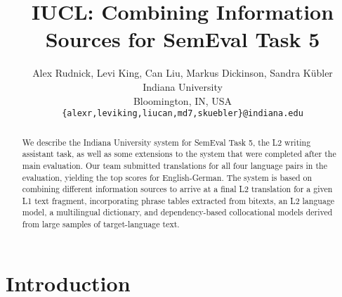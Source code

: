 \documentclass[11pt]{article}
\title{IUCL: Combining Information Sources for SemEval Task 5}
\author{Alex Rudnick, Levi King, Can Liu, Markus Dickinson, Sandra K\"ubler  \\
  Indiana University \\
  Bloomington, IN, USA \\
  {\tt \{alexr,leviking,liucan,md7,skuebler\}@indiana.edu} }
\date{}
\begin{document}
\maketitle
\begin{abstract}
We describe the Indiana University system for SemEval Task 5, the L2
writing assistant task, as well as some extensions to the system that were
completed after the main evaluation. Our team submitted translations for all
four language pairs in the evaluation, yielding the top scores for
English-German.  The system is based on combining different information sources
to arrive at a final L2 translation for a given L1 text fragment, incorporating
phrase tables extracted from bitexts, an L2 language model, a multilingual
dictionary, and dependency-based collocational models derived from large
samples of target-language text.
\end{abstract}


\section{Introduction}

\end{document}
